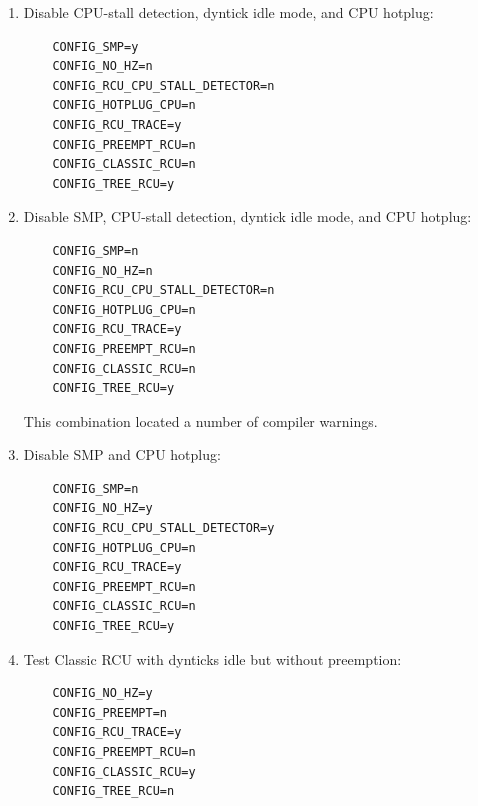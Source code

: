 \begin{enumerate}
\item	Disable CPU-stall detection, dyntick idle mode, and CPU hotplug:

\vspace{5pt}
\begin{minipage}[t]{\columnwidth}
\small
\begin{verbatim}
	CONFIG_SMP=y
	CONFIG_NO_HZ=n
	CONFIG_RCU_CPU_STALL_DETECTOR=n
	CONFIG_HOTPLUG_CPU=n
	CONFIG_RCU_TRACE=y
	CONFIG_PREEMPT_RCU=n
	CONFIG_CLASSIC_RCU=n
	CONFIG_TREE_RCU=y
\end{verbatim}
\end{minipage}
\vspace{5pt}

\item	Disable SMP, CPU-stall detection, dyntick idle mode, and CPU hotplug:

\vspace{5pt}
\begin{minipage}[t]{\columnwidth}
\small
\begin{verbatim}
	CONFIG_SMP=n
	CONFIG_NO_HZ=n
	CONFIG_RCU_CPU_STALL_DETECTOR=n
	CONFIG_HOTPLUG_CPU=n
	CONFIG_RCU_TRACE=y
	CONFIG_PREEMPT_RCU=n
	CONFIG_CLASSIC_RCU=n
	CONFIG_TREE_RCU=y
\end{verbatim}
\end{minipage}
\vspace{5pt}
	This combination located a number of compiler warnings.

\item	Disable SMP and CPU hotplug:

\vspace{5pt}
\begin{minipage}[t]{\columnwidth}
\small
\begin{verbatim}
	CONFIG_SMP=n
	CONFIG_NO_HZ=y
	CONFIG_RCU_CPU_STALL_DETECTOR=y
	CONFIG_HOTPLUG_CPU=n
	CONFIG_RCU_TRACE=y
	CONFIG_PREEMPT_RCU=n
	CONFIG_CLASSIC_RCU=n
	CONFIG_TREE_RCU=y
\end{verbatim}
\end{minipage}
\vspace{5pt}

\item	Test Classic RCU with dynticks idle but without preemption:

\vspace{5pt}
\begin{minipage}[t]{\columnwidth}
\small
\begin{verbatim}
	CONFIG_NO_HZ=y
	CONFIG_PREEMPT=n
	CONFIG_RCU_TRACE=y
	CONFIG_PREEMPT_RCU=n
	CONFIG_CLASSIC_RCU=y
	CONFIG_TREE_RCU=n
\end{verbatim}
\end{minipage}
\vspace{5pt}


\end{enumerate}
